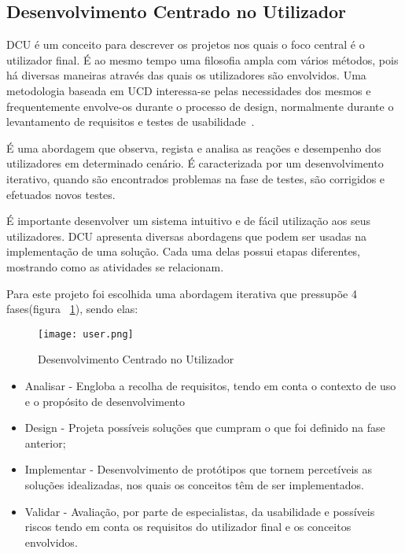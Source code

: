 \subsection*{Desenvolvimento Centrado no Utilizador}

DCU é um conceito para descrever os projetos nos quais o foco central é o utilizador final. É ao mesmo tempo uma filosofia ampla com vários métodos, pois há diversas maneiras através das quais os utilizadores são envolvidos. Uma metodologia baseada em UCD interessa-se pelas necessidades dos mesmos e frequentemente envolve-os durante o processo de design, normalmente durante o levantamento de requisitos e testes de usabilidade~\cite{Abras2004}.

É uma abordagem que observa, regista e analisa as reações e desempenho dos utilizadores em determinado cenário. É caracterizada por um desenvolvimento iterativo, quando são encontrados problemas na fase de testes, são corrigidos e efetuados novos testes.

É importante desenvolver um sistema intuitivo e de fácil utilização aos seus utilizadores. DCU apresenta diversas abordagens que podem ser usadas na implementação de uma solução. Cada uma delas possui etapas diferentes, mostrando como as atividades se relacionam. 

Para este projeto foi escolhida uma abordagem iterativa que pressupõe 4 fases(figura ~\ref{fig:user-center}), sendo elas:

\begin{figure}[h]
\centering
\texttt{[image: user.png]}
\caption[Desenvolvimento Centrado no Utilizador] {Desenvolvimento Centrado no Utilizador\protect\footnotemark}
\label{fig:user-center}
\end{figure}

\begin{itemize}
\item Analisar - Engloba a recolha de requisitos, tendo em conta o contexto de uso e o propósito de desenvolvimento
\item Design - Projeta possíveis soluções que cumpram o que foi definido na fase anterior;
\item Implementar - Desenvolvimento de protótipos que tornem percetíveis as soluções idealizadas, nos quais os conceitos têm de ser implementados.
\item Validar - Avaliação, por parte de especialistas, da usabilidade e possíveis riscos tendo em conta os requisitos do utilizador final e os conceitos envolvidos.
\end{itemize} 

